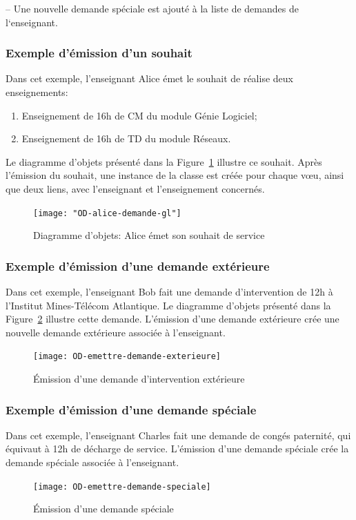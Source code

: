 \begin{ocl}
\begin{ocl}
-- Une nouvelle demande spéciale est ajouté à la liste de demandes de l`enseignant.
\end{ocl}


\subsubsection{Exemple d'émission d'un souhait}
Dans cet exemple, l'enseignant Alice émet le souhait de réalise deux enseignements:
\begin{enumerate}
	\item Enseignement de 16h de CM du module Génie Logiciel;
	\item Enseignement de 16h de TD du module Réseaux.
\end{enumerate}
Le diagramme d'objets présenté dans la Figure~\ref{fig:souhait-alice} illustre ce souhait.
Après l'émission du souhait, une instance de la classe  est créée pour chaque vœu, ainsi que deux liens, avec l'enseignant et l'enseignement concernés. 

 \begin{figure}[!htbp]
 \begin{center}
 \texttt{[image: "OD-alice-demande-gl"]}
 \caption{Diagramme d'objets: Alice émet son souhait de service}
 \end{center}
 \label{fig:souhait-alice}
 \end{figure}


 \subsubsection{Exemple d'émission d'une demande extérieure}
Dans cet exemple, l'enseignant Bob fait une demande d'intervention de 12h à l'Institut Mines-Télécom Atlantique.
Le diagramme d'objets présenté dans la Figure~\ref{fig:demande:exterieure} illustre cette demande.
L'émission d'une demande extérieure crée une nouvelle demande extérieure associée à l'enseignant.
 
 \begin{figure}[!htbp]
 \begin{center}
 \texttt{[image: OD-emettre-demande-exterieure]}
 \caption{\'Emission d'une demande d'intervention extérieure}
 \label{fig:demande:exterieure}
 \end{center}
 \end{figure}

 \subsubsection{Exemple d'émission d'une demande spéciale}
Dans cet exemple, l'enseignant Charles fait une demande de congés paternité, qui équivaut à 12h de décharge de service.
L'émission d'une demande spéciale crée la demande spéciale associée à l'enseignant.
\begin{figure}[!htbp]
\begin{center}
\texttt{[image: OD-emettre-demande-speciale]}
\caption{\'Emission d'une demande spéciale}
\end{center}
\end{figure}





\end{ocl}
